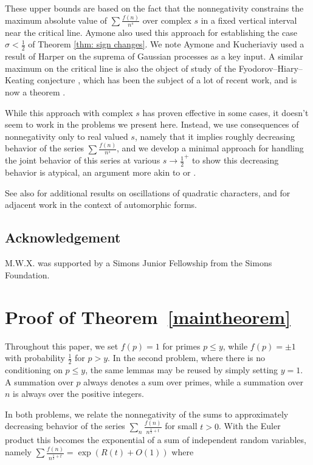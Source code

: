 \documentclass[12pt]{amsart}
\theoremstyle{remark}
\theoremstyle{definition}
\theoremstyle{remark}
\numberwithin{equation}{section}
\begin{document}
These upper bounds are based on the fact that the nonnegativity constrains the maximum absolute value of $\sum \frac{f(n)}{n^s}$ over complex $s$ in a fixed vertical interval near the critical line. Aymone also used this approach for establishing the case $\sigma < \frac{1}{2}$ of Theorem \ref{thm: sign changes}. We note Aymone and Kucheriaviy used a result of Harper on the suprema of Gaussian processes \cite{Harpersup} as a key input. A similar maximum on the critical line is also the object of study of the Fyodorov--Hiary--Keating conjecture \cite{FHK}, which has been the subject of a lot of recent work, and is now a theorem \cite{fhk1, fhk2}.

While this approach with complex $s$ has proven effective in some cases, it doesn't seem to work in the problems we present here. Instead, we use consequences of nonnegativity only to real valued $s$, namely that it implies roughly decreasing behavior of the series $\sum \frac{f(n)}{n^s}$, and we develop a minimal approach for handling the joint behavior of this series at various $s\rightarrow \frac{1}{2}^+$ to show this decreasing behavior is atypical, an argument more akin to \cite{BM89} or  \cite{klurman2024signchangesshortcharacter}.

See also \cite{lamzouri2026realzeroslschid} for additional results on oscillations of quadratic characters, and \cite{Sarnak2011Letter, Jung2016} for adjacent work in the context of automorphic forms.




\subsection*{Acknowledgement} 
M.W.X. was supported by a Simons Junior Fellowship from the Simons Foundation.

\section{Proof of Theorem~\ref{maintheorem}}

Throughout this paper, we set $f(p) = 1$ for primes $p \le y$, while $f(p) = \pm 1$ with probability $\frac{1}{2}$ for $p>y$. In the second problem, where there is no conditioning on $p \le y$, the same lemmas may be reused by simply setting $y=1$. A summation over $p$ always denotes a sum over primes, while a summation over $n$ is always over the positive integers.

In both problems, we relate the nonnegativity of the sums to approximately decreasing behavior of the series $\sum_n \frac{f(n)}{n^{\frac{1}{2}+t}}$ for small $t>0$. With the Euler product this becomes the exponential of a sum of independent random variables, namely $\sum \frac{f(n)}{n^{\frac{1}{2}+t}} = \exp(R(t)+O(1))$ where
\end{document}

